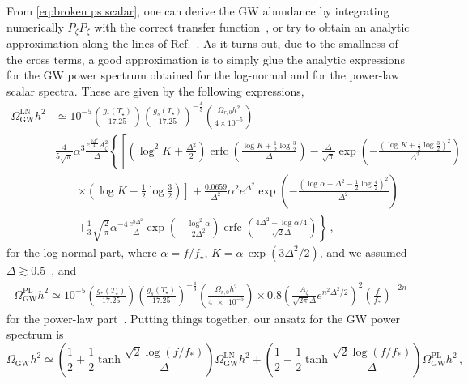\documentclass{article}
\newcommand*{\geff}{\ensuremath{g_{*}}\xspace}
\newcommand*{\gs}{\ensuremath{g_{s}}\xspace}
\DeclareMathOperator{\erfc}{erfc}
\begin{document}
From \cref{eq:broken ps scalar}, one can derive the GW abundance by integrating numerically $P_\zeta P_\zeta$ with the correct transfer function~\cite{Espinosa:2018eve, Kohri:2018awv}, or try to obtain an analytic approximation along the lines of Ref.~\cite{Pi:2020otn}.
As it turns out, due to the smallness of the cross terms, a good approximation is to simply glue the analytic expressions for the GW power spectrum obtained for the log-normal and for the power-law scalar spectra. These are given by the following expressions,
%
\begin{align}
\Omega_\mathrm{GW}^\mathrm{LN} h^2 & \simeq 10^{-5}\left(\frac{\geff(T_\star)}{17.25}\right)\left(\frac{\gs(T_\star)}{17.25}\right)^{-\frac{4}{3}}\left(\frac{\Omega_{r,0}h^2}{4\times 10^{-5}}\right) \nonumber\\
& \frac{4}{5\sqrt{\pi}} \alpha^3 \frac{e^{\frac{9\Delta^2}{4}}A_{\zeta}^2}{\Delta} \left\{\left[\left(\log^2 K +\frac{\Delta^2}{2}\right)\erfc\left(\frac{\log K+\frac{1}{2}\log\frac{3}{2}}{\Delta}\right)-\frac{\Delta}{\sqrt{\pi}} \exp\left( -\frac{\left(\log K+\frac{1}{2}\log\frac{3}{2}\right)^2}{\Delta^2}\right) \right. \right. \nonumber\\
& \qquad \left. \times \left(\log K-\frac{1}{2}\log\frac{3}{2}\right) \right] + \frac{0.0659}{\Delta^2}\alpha^2e^{\Delta^2}\exp\left(-\frac{\left(\log\alpha+\Delta^2-\frac{1}{2}\log\frac{4}{2}\right)^2}{\Delta^2}\right) \nonumber\\
& \qquad \left. + \frac{1}{3}\sqrt{\frac{2}{\pi}}\alpha^{-4}\frac{e^{8\Delta^2}}{\Delta}\exp\left(-\frac{\log^2\alpha}{2\Delta^2}\right)\erfc\left( \frac{4\Delta^2-\log\alpha/4}{\sqrt{2}\Delta}\right) \right\} \,, 
\end{align}
%
for the log-normal part, where $\alpha =f/f_\star$, $K=\alpha \,\exp\left(3\Delta^2/2\right)$, and we assumed $\Delta\gtrsim 0.5$~\cite{Pi:2020otn, Dandoy:2023jot}, and
%
\begin{align}
    \Omega_\mathrm{GW}^\mathrm{PL} h^2 \simeq 
    10^{-5}\left(\frac{\geff(T_\star)}{17.25}\right)\left(\frac{\gs(T_\star)}{17.25}\right)^{-\frac{4}{3}}\left(\frac{\Omega_{r,0}h^2}{\num{4e-5}}\right) \times 
    0.8 \left( \frac{A_\zeta}{\sqrt{2\pi} \Delta} e^{n^2\Delta^2/2} \right)^2 \left( \frac{f}{f_*}\right)^{-2n}
\end{align}
for the power-law part~\cite{Kohri:2018awv}. Putting things together, our ansatz for the GW power spectrum is
%
\begin{equation}\label{eq:broken ps scalar GW}
    \Omega_\mathrm{GW} h^2 \simeq \left(\frac{1}{2}+\frac{1}{2}\tanh \frac{\sqrt{2}\log(f/f_*)}{\Delta} \right) \Omega_\mathrm{GW}^\mathrm{LN} h^2
    +
    \left(\frac{1}{2}-\frac{1}{2}\tanh \frac{\sqrt{2}\log(f/f_*)}{\Delta} \right) \Omega_\mathrm{GW}^\mathrm{PL} h^2 \,,
\end{equation}
\end{document}
